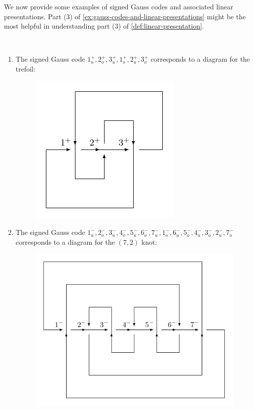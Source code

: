 We now provide some examples of signed Gauss codes and associated
linear presentations. Part (3) of
\cref{ex:gauss-codes-and-linear-presentations} might be the most
helpful in understanding part (3) of \cref{def:linear-presentation}.
\begin{example}\label{ex:gauss-codes-and-linear-presentations}~
  \begin{enumerate}
    \item The signed Gauss code $1^+_{u}, 2^{+}_{o}, 3^+_{u},
      1^{+}_o, 2^+_u, 3^+_o$ corresponds to a diagram for the trefoil:
      \begin{figure}[H]
        \centering
        \includegraphics[scale=.55]{figures/background/3_1_0.pdf}
      \end{figure}
    \item The signed Gauss code $1^-_u, 2^-_o, 3^-_u, 4^-_o, 5^-_u,
      6^-_o, 7^-_u, 1^-_o, 6^-_u, 5^-_o, 4^-_u, 3^-_o, 2^-_u, 7^-_o$
      corresponds to a diagram for the $(7,2)$ knot:
      \begin{figure}[H]
        \centering
        \includegraphics[scale=.55]{figures/background/7_2_2.pdf}

\end{figure}
\end{enumerate}
\end{example}
